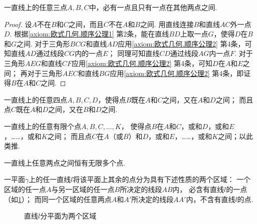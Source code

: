 \begin{theorem}\label{theorem:欧式几何.定理4}
一直线上的任意三点\(A,B,C\)中，必有一点且只有一点在其他两点之间.
\begin{proof}
设\(A\)不在\(B\)和\(C\)之间，而且\(C\)不在\(A\)和\(B\)之间.
用直线连接\(B\)和直线\(AC\)外一点\(D\).
根据\cref{axiom:欧式几何.顺序公理1} 第2条，能在直线\(BD\)上取一点\(G\)，使得\(D\)在\(B\)和\(G\)之间.
对于三角形\(BCG\)和直线\(AD\)应用\cref{axiom:欧式几何.顺序公理2} 第4条，可知直线\(AD\)通过线段\(CG\)内的一点\(E\)；
同理可知直线\(CD\)通过线段\(AG\)内一点\(F\).
对于三角形\(AEG\)和直线\(CF\)应用\cref{axiom:欧式几何.顺序公理2} 第4条，可知\(D\)在\(A\)和\(E\)之间；
再对于三角形\(AEC\)和直线\(BG\)应用\cref{axiom:欧式几何.顺序公理2} 第4条，即证得\(B\)在\(A\)和\(C\)之间.
\end{proof}
\end{theorem}

\begin{theorem}\label{theorem:欧式几何.定理5}
一直线上的任意四点\(A,B,C,D\)，使得点\(B\)既在\(A\)和\(C\)之间，又在\(A\)和\(D\)之间；
而且点\(C\)既在\(A\)和\(D\)之间，又在\(B\)和\(D\)之间.
\end{theorem}

\begin{corollary}\label{theorem:欧式几何.定理6}
一直线上的任意有限个点\(A,B,C,\dotsc,K\)，
使得点\(B\)在\(A\)和\(C\)，或和\(D\)，或和\(E\)，……，或和\(K\)之间；
而且点\(C\)在\(A\)（或\(B\)）和\(D\)，或和\(E\)，……，或和\(K\)之间；以此类推.
\end{corollary}

\begin{corollary}\label{theorem:欧式几何.定理7}
一直线上任意两点之间恒有无限多个点.
\end{corollary}

\begin{theorem}\label{theorem:欧式几何.定理8}
一平面\(\gamma\)上的任一直线\(l\)将该平面上其余的点分为具有下述性质的两个区域：
一个区域的任一点\(A\)与另一区域的任一点\(B\)所决定的线段\(AB\)内，
必含有直线\(l\)的一点（如\cref{figure:欧式几何.直线l分平面为两个区域}）；
而同一个区域的任意两点\(A\)和\(A'\)所决定的线段\(AA'\)内，不含有直线\(l\)的点.
\begin{figure}[ht]
\centering
{}
\caption{直线\(l\)分平面为两个区域}
\label{figure:欧式几何.直线l分平面为两个区域}
\end{figure}
\end{theorem}

